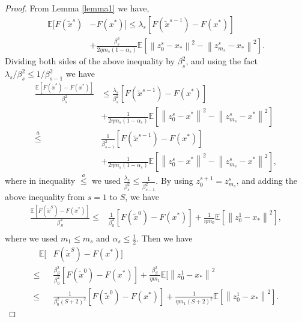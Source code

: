 \documentclass[conference]{IEEEtran}
\newcommand*{\E}{\mathbb{E}}
\newcommand{\norm}[1]{\left\lVert#1\right\rVert}
\theoremstyle{definition}
\theoremstyle{remark}
\begin{document}
\begin{proof}
From Lemma \ref{lemma1} we have,
\begin{equation}
\begin{split}
\E[F(\widetilde{x}^s)&-F(x^*)]\leq  \lambda_s[F({\widetilde x}^{s-1})-F(x^*)]\\ 
&+ {\frac{\beta_s^2}{2\eta m_s(1-\alpha_s)}}\E[\norm{z_{0}^s-x_*}^2-\norm{z_{m_s}^s-x_*}^2].
\end{split}
\end{equation}
Dividing both sides of the above inequality by $\beta_s^2$, and using the fact $\lambda_s/\beta_s^2 \leq 1/\beta_{s-1}^2$ we have
\begin{equation*}
\begin{split}
\frac{\E[F(\widetilde{x}^s)-F(x^*)]}{\beta_s^2}&\leq  \frac{\lambda_s}{\beta_s^2}[F(\widetilde{x}^{s-1})-F(x^*)]\\ 
& + {\frac{1 }{2\eta m_s(1-\alpha_s)}}\E[\norm{z_{0}^s-x^*}^2-\norm{z_{m_s}^s-x^*}^2]\\
\stackrel{a}{\leq} & \frac{1}{\beta_{s-1}^2}[F(\widetilde{x}^{s-1})-F(x^*)] \\
&+ {\frac{1}{2\eta m_s(1-\alpha_s)}}\E[\norm{z_{0}^s-x^*}^2-\norm{z_{m_s}^s-x^*}^2], 
\end{split}
\end{equation*}
where in inequality $\stackrel{a}{\leq}$ we used $\frac{\lambda_s}{\beta_s^2}\leq \frac{1}{\beta_{s-1}^2}$. By using $z_0^{s+1} = z_{m_s}^s$, and adding the above inequality from $s=1$ to $S$, we have
\begin{equation*}
\begin{split}
\frac{\E[F(\widetilde{x}^S)-F(x^*)]}{\beta_S^2}\leq & \frac{1}{\beta_{0}^2}[F(\widetilde{x}^{0})-F(x^*)] + {\frac{1}{\eta m_0}}\E\left[\norm{z_{0}^1-x_*}^2\right], \\
\end{split}
\end{equation*}
where we used $m_1\leq m_s$ and $\alpha_s\leq \frac{1}{2}$.
Then we have
\begin{equation*}
\begin{split}
~~~\E[& F(\widetilde{x}^S)-F(x^*)]\\
\leq & \frac{\beta_S^2}{\beta_{0}^2}[F(\widetilde{x}^{0})-F(x^*)]+ {\frac{ \beta_S^2}{\eta m_1}}\E[\norm{z_{0}^1-x_*}^2\\
\leq & \frac{1}{\beta_{0}^2(S+2)^2}[F(\widetilde{x}^{0})-F(x^*)] + {\frac{1 }{\eta m_1(S+2)^2}}\E[\norm{z_{0}^1-x_*}^2].
\end{split}
\end{equation*}


\end{proof}
\end{document}
